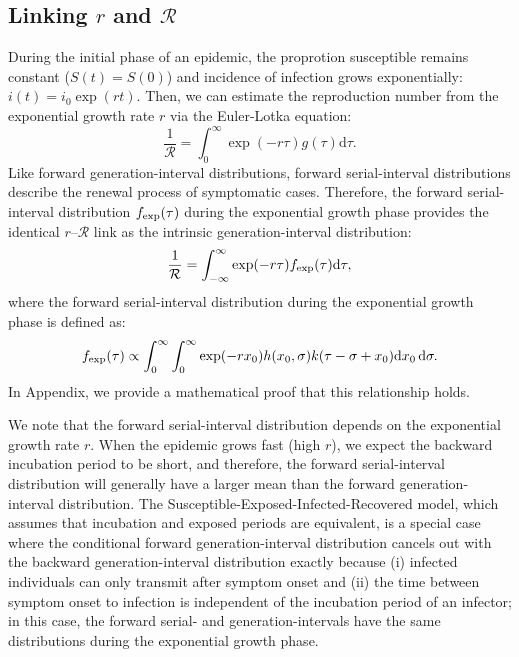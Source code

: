 \documentclass[12pt]{article}
\begin{document}
\subsection{Linking $r$ and $\mathcal R$}

During the initial phase of an epidemic, the proprotion susceptible remains constant ($S(t) = S(0)$) and incidence of infection grows exponentially: $i(t)=i_0\exp(rt)$.
Then, we can estimate the reproduction number from the exponential growth rate $r$ via the Euler-Lotka equation:
\begin{equation}
\frac{1}{\mathcal R} = \int_0^\infty \exp(-r\tau) g(\tau) \mathrm{d} \tau.
\end{equation}
Like forward generation-interval distributions, 
forward serial-interval distributions describe the renewal process of symptomatic cases.
Therefore, the forward serial-interval distribution $f_{\tiny\textrm{exp}}(\tau)$ during the exponential growth phase provides the identical $r$--$\mathcal R$ link as the intrinsic generation-interval distribution:
\begin{equation}
\frac{1}{\mathcal R} = \int_{-\infty}^\infty \exp(-r\tau) f_{\tiny\textrm{exp}}(\tau) \mathrm{d} \tau,
\end{equation}
where the forward serial-interval distribution during the exponential growth phase is defined as:
\begin{equation}
f_{\tiny\textrm{exp}}(\tau) \propto \int_{0}^\infty \int_{0}^\infty \exp( -r x_0) h(x_0, \sigma) k(\tau-\sigma+x_0) \mathrm{d} x_0\, \mathrm{d}\sigma.
\end{equation}
In Appendix, we provide a mathematical proof that this relationship holds.

We note that the forward serial-interval distribution depends on the exponential growth rate $r$.
When the epidemic grows fast (high $r$), we expect the backward incubation period to be short, and therefore, the forward serial-interval distribution will generally have a larger mean than the forward generation-interval distribution.
The Susceptible-Exposed-Infected-Recovered model, which assumes that incubation and exposed periods are equivalent, is a special case where the conditional forward generation-interval distribution cancels out with the backward generation-interval distribution exactly because (i) infected individuals can only transmit after symptom onset and (ii) the time between symptom onset to infection is independent of the incubation period of an infector;
in this case, the forward serial- and generation-intervals have the same distributions during the exponential growth phase.
\end{document}
